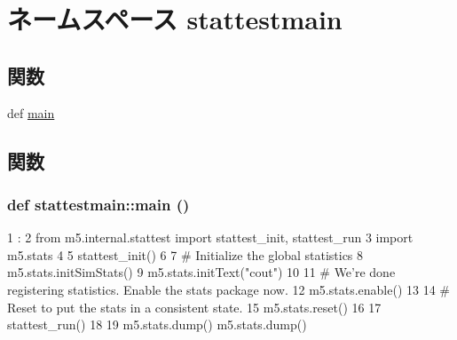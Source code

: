 \hypertarget{namespacestattestmain}{
\section{ネームスペース stattestmain}
\label{namespacestattestmain}
}
\subsection*{関数}
\begin{DoxyCompactItemize}
\item 
def \hyperlink{namespacestattestmain_af77b52160330fcea4f3390c2c87f3b7e}{main}
\end{DoxyCompactItemize}


\subsection{関数}
\hypertarget{namespacestattestmain_af77b52160330fcea4f3390c2c87f3b7e}{
\subsubsection[{main}]{\setlength{\rightskip}{0pt plus 5cm}def stattestmain::main ()}}
\label{namespacestattestmain_af77b52160330fcea4f3390c2c87f3b7e}



\begin{DoxyCode}
1           :
2     from m5.internal.stattest import stattest_init, stattest_run
3     import m5.stats
4 
5     stattest_init()
6 
7     # Initialize the global statistics
8     m5.stats.initSimStats()
9     m5.stats.initText("cout")
10 
11     # We're done registering statistics.  Enable the stats package now.
12     m5.stats.enable()
13 
14     # Reset to put the stats in a consistent state.
15     m5.stats.reset()
16 
17     stattest_run()
18 
19     m5.stats.dump()
    m5.stats.dump()
\end{DoxyCode}
